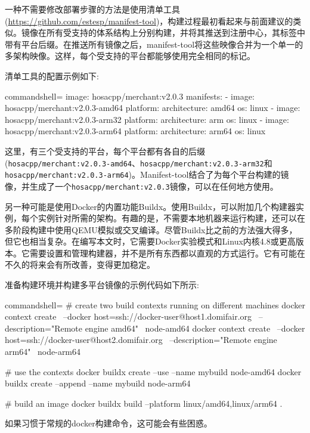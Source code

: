 一种不需要修改部署步骤的方法是使用清单工具(\url{https://github.com/estesp/manifest-tool})，构建过程最初看起来与前面建议的类似。镜像在所有受支持的体系结构上分别构建，并将其推送到注册中心，其标签中带有平台后缀。在推送所有镜像之后，manifest-tool将这些映像合并为一个单一的多架构映像。这样，每个受支持的平台都能够使用完全相同的标记。

清单工具的配置示例如下:

\begin{tcblisting}{commandshell={}}
image: hosacpp/merchant:v2.0.3
manifests:
  - image: hosacpp/merchant:v2.0.3-amd64
    platform:
      architecture: amd64
      os: linux
  - image: hosacpp/merchant:v2.0.3-arm32
    platform:
      architecture: arm
      os: linux
  - image: hosacpp/merchant:v2.0.3-arm64
    platform:
      architecture: arm64
      os: linux
\end{tcblisting}

这里，有三个受支持的平台，每个平台都有各自的后缀(\texttt{hosacpp/merchant:v2.0.3-amd64}、\texttt{hosacpp/merchant:v2.0.3-arm32}和\texttt{hosacpp/merchant:v2.0.3-arm64})。Manifest-tool结合了为每个平台构建的镜像，并生成了一个\texttt{hosacpp/merchant:v2.0.3}镜像，可以在任何地方使用。

另一种可能是使用Docker的内置功能Buildx。使用Buildx，可以附加几个构建器实例，每个实例针对所需的架构。有趣的是，不需要本地机器来运行构建，还可以在多阶段构建中使用QEMU模拟或交叉编译。尽管Buildx比之前的方法强大得多，但它也相当复杂。在编写本文时，它需要Docker实验模式和Linux内核4.8或更高版本。它需要设置和管理构建器，并不是所有东西都以直观的方式运行。它有可能在不久的将来会有所改善，变得更加稳定。

准备构建环境并构建多平台镜像的示例代码如下所示:

\begin{tcblisting}{commandshell={}}
# create two build contexts running on different machines
docker context create \
    --docker host=ssh://docker-user@host1.domifair.org \
    --description="Remote engine amd64" \
    node-amd64
docker context create \
    --docker host=ssh://docker-user@host2.domifair.org \
    --description="Remote engine arm64" \
    node-arm64

# use the contexts
docker buildx create --use --name mybuild node-amd64
docker buildx create --append --name mybuild node-arm64

# build an image
docker buildx build --platform linux/amd64,linux/arm64 .
\end{tcblisting}

如果习惯于常规的docker构建命令，这可能会有些困惑。

